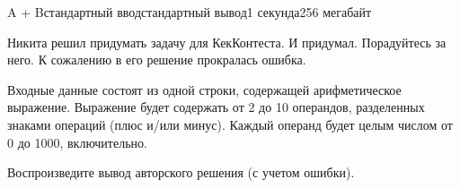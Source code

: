\begin{problem}{A + B}{стандартный ввод}{стандартный вывод}{1 секунда}{256 мегабайт}

Никита решил придумать задачу для КекКонтеста. И придумал. Порадуйтесь за него. К сожалению в его решение прокралась ошибка.

\InputFile
Входные данные состоят из одной строки, содержащей арифметическое выражение. Выражение будет содержать от 2 до 10 операндов, разделенных знаками операций (плюс и/или минус). Каждый операнд будет целым числом от 0 до 1000, включительно.

\OutputFile
Воспроизведите вывод авторского решения (с учетом ошибки).

\Examples

\begin{example}
%
%
%
\end{example}

\end{problem}

